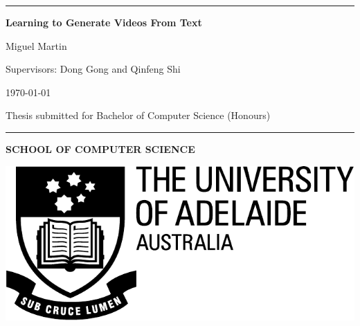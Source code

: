 \documentclass{report}
\theoremstyle{plain}
\theoremstyle{definition}
\theoremstyle{remark}
\numberwithin{equation}{section}
\numberwithin{figure}{section}
\newcommand{\<}{\langle}
\renewcommand{\>}{\rangle}
\begin{document}
%
%
\begin{titlepage}
\begin{flushleft}
\hrule
\vspace{1 cm}


{\huge{\bf Learning to Generate Videos From Text}}
\vspace*{2cm}




\vspace{1 cm}
{\large Miguel Martin}

\vspace{0.5 cm}

{\large Supervisors: Dong Gong and Qinfeng Shi}

\vspace{0.5 cm}

{\today}

\vspace{2.5 cm}

    { Thesis submitted for Bachelor of Computer Science (Honours) }


\vspace{10 cm}


\hrule


\end{flushleft}
\begin{flushleft}
\textbf{\textsf{SCHOOL OF COMPUTER SCIENCE}}
\end{flushleft}


\vspace{-1cm}
%
%

%
\begin{flushright}
\includegraphics[scale=0.25]{ua_crest.pdf}
\end{flushright}
\vspace{-2 cm}

\end{titlepage}


%
%
\end{document}

